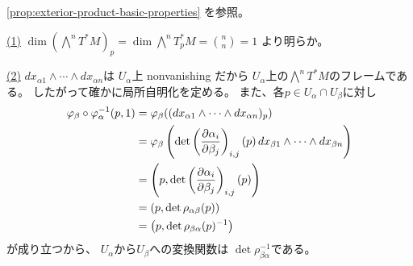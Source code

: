 \documentclass[report]{jlreq}
\begin{document}
\begin{answer}
    \cref{prop:exterior-product-basic-properties} を参照。
\end{answer}


\begin{answer}
    \uline{(1)} \quad
    $\dim \left(\bigwedge^n T^* M\right)_p
        = \dim \bigwedge^n T^*_p M
        = \binom{n}{n}
        = 1$
    より明らか。

    \uline{(2)} \quad
    $dx_{\alpha 1} \wedge \cdots \wedge dx_{\alpha n}$は
    $U_\alpha$上 nonvanishing だから
    $U_\alpha$上の$\bigwedge^n T^* M$のフレームである。
    したがって確かに局所自明化を定める。
    また、各$p \in U_\alpha \cap U_\beta$に対し
    \begin{alignat}{1}
        \varphi_\beta \circ \varphi_\alpha^{-1}(p, 1)
            &= \varphi_\beta((dx_{\alpha 1} \wedge \cdots \wedge dx_{\alpha n})_p) \\
            &= \varphi_\beta\left(
                \det\left(\deldel[\alpha_i]{\beta_j}\right)_{i, j}(p) \,
                dx_{\beta 1} \wedge \cdots \wedge dx_{\beta n}
            \right) \\
            &= \left(
                p,
                \det\left(\deldel[\alpha_i]{\beta_j}\right)_{i, j}(p)
            \right) \\
            &= \left( p, \det \rho_{\alpha\beta}(p) \right) \\
            &= \left( p, \det \rho_{\beta\alpha}(p)^{-1} \right)
    \end{alignat}
    が成り立つから、
    $U_\alpha$から$U_\beta$への変換関数は
    $\det \rho_{\beta\alpha}^{-1}$である。
\end{answer}
\end{document}
